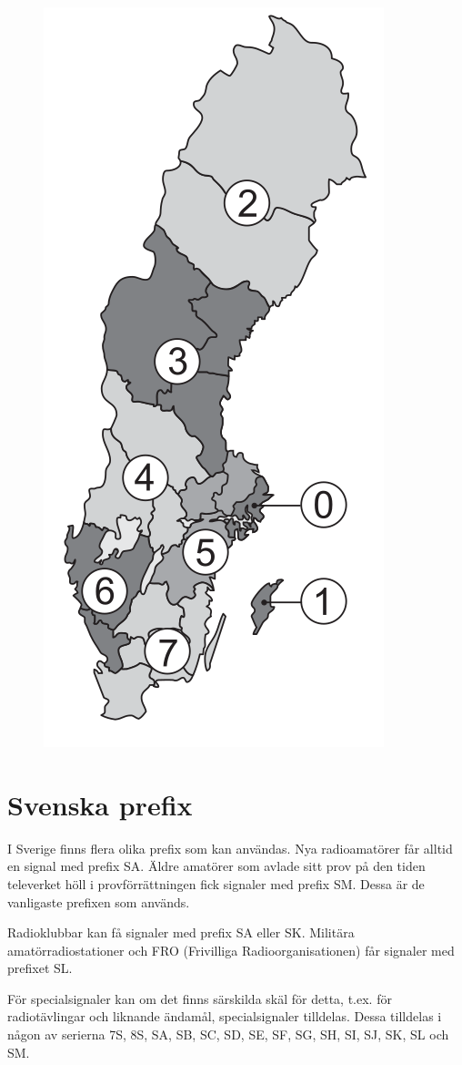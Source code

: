 \begin{figure}
  \centering
  \includegraphics[width=.5\columnwidth]{blabok/pictures/R5-1.png}
\end{figure}

\newpage

\section{Svenska prefix}

I Sverige finns flera olika prefix som kan användas. Nya radioamatörer
får alltid en signal med prefix SA. Äldre amatörer som avlade sitt
prov på den tiden televerket höll i provförrättningen fick signaler
med prefix SM. Dessa är de vanligaste prefixen som används.

Radioklubbar kan få signaler med prefix SA eller SK. Militära
amatörradiostationer och FRO (Frivilliga Radioorganisationen) får
signaler med prefixet SL.

För specialsignaler kan om det finns särskilda skäl för detta, t.ex.
för radiotävlingar och liknande ändamål, specialsignaler tilldelas.
Dessa tilldelas i någon av serierna 7S, 8S, SA, SB, SC, SD, SE, SF,
SG, SH, SI, SJ, SK, SL och SM.

